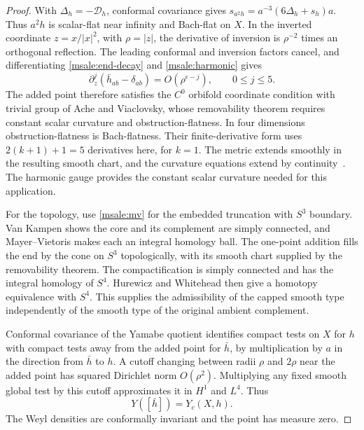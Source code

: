 \documentclass[11pt]{article}
\numberwithin{equation}{section}
\theoremstyle{definition}
\theoremstyle{remark}
\begin{document}
\begin{proof}
With \(\Delta_h=-\mathcal D_h\), conformal covariance gives
\(s_{a^2h}=a^{-3}(6\Delta_h+s_h)a\). Thus \(a^2h\) is
scalar-flat near infinity and Bach-flat on \(X\).
In the inverted coordinate \(z=x/|x|^2\), with \(\rho=|z|\),
the derivative of inversion is \(\rho^{-2}\) times an orthogonal
reflection. The leading conformal and inversion factors cancel,
and differentiating \eqref{msale:end-decay} and
\eqref{msale:harmonic} gives
\[
 \partial_z^j(\bar h_{ab}-\delta_{ab})
                  =O(\rho^{\epsilon-j}),\qquad 0\le j\le5.
\]
The added point therefore satisfies the \(C^0\) orbifold
coordinate condition with trivial group of Ache and Viaclovsky,
whose removability theorem requires constant scalar curvature and
obstruction-flatness. In four dimensions obstruction-flatness is
Bach-flatness. Their finite-derivative form uses \(2(k+1)+1=5\)
derivatives here, for \(k=1\). The metric extends smoothly in the
resulting smooth chart, and the curvature equations extend by
continuity~\cite[Definition 1.6, Theorem 1.8 and Remark 7.2]
{AcheViaclovsky2011Obstruction}. The harmonic gauge provides the
constant scalar curvature needed for this application.

For the topology, use \eqref{msale:mv} for the embedded truncation
with \(S^3\) boundary. Van Kampen shows the core and its complement
are simply connected, and Mayer--Vietoris makes each an integral
homology ball. The one-point addition fills the end by the cone
on \(S^3\) topologically, with its smooth chart supplied by the
removability theorem. The compactification is simply connected
and has the integral homology of \(S^4\). Hurewicz and Whitehead
then give a homotopy equivalence with \(S^4\). This supplies the
admissibility of the capped smooth type independently of the
smooth type of the original ambient complement.

Conformal covariance of the Yamabe quotient identifies compact
tests on \(X\) for \(h\) with compact tests away from the added
point for \(\bar h\), by multiplication by \(a\) in the direction
from \(\bar h\) to \(h\). A cutoff changing between radii
\(\rho\) and \(2\rho\) near the added point has squared
Dirichlet norm \(O(\rho^2)\). Multiplying any fixed smooth
global test by this cutoff approximates it in \(H^1\) and
\(L^4\). Thus
\begin{equation}\label{msale:cap-yamabe}
 Y([\bar h])=Y_c(X,h).
\end{equation}
The Weyl densities are conformally invariant and the point has
measure zero.


\end{proof}
\end{document}
